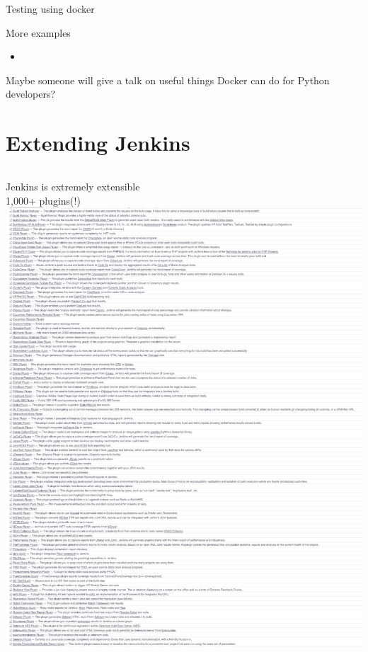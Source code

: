 \documentclass[xcolor=svgnames,17pt]{beamer}
\begin{document}
\begin{frame}{Testing using docker}
\end{frame}

\begin{frame}{More examples}
\begin{itemize}
\item \href{https://stripe.com/blog/distributed-ruby-testing}{%
    }
\end{itemize}
\pause
Maybe someone will give a talk on useful things Docker can do for Python
developers?
\end{frame}

\section{Extending Jenkins}

\begin{frame}[plain]{}
\tableofcontents[currentsection]
\end{frame}

\begin{frame}[plain]{}
\begin{columns}
Jenkins is extremely extensible \\
\vspace*{\baselineskip}
1,000+ plugins(!)
\includegraphics[height=\paperheight]{plugin-list.png}
\end{columns}
\end{frame}
\end{document}
